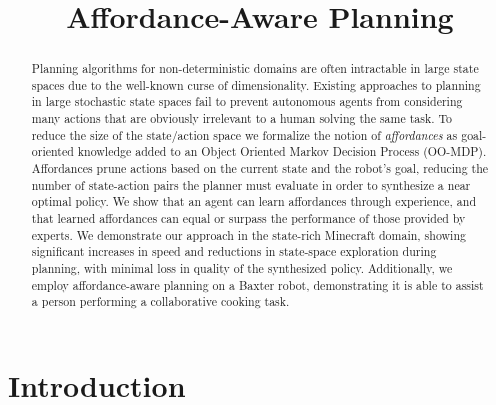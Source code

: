 \documentclass[conference]{IEEEtran}
\newcommand{\dnote}[1]{\textcolor{Green}{\textbf{}}}
\begin{document}
\title{Affordance-Aware Planning}


\maketitle

\begin{abstract}
Planning algorithms for non-deterministic domains are often
intractable in large state spaces due to the well-known curse of
dimensionality. Existing approaches to planning in large stochastic
state spaces fail to prevent autonomous agents from considering many
actions that are obviously irrelevant to a human solving the same
task. To reduce the size of the state/action space
we formalize the notion of {\em affordances} as
goal-oriented knowledge added to an Object Oriented Markov Decision
Process (OO-MDP).  Affordances prune actions based on the current
state and the robot's goal, reducing the number of state-action pairs
the planner must evaluate in order to synthesize a near optimal
policy. We show that an agent can learn affordances through
experience, and that learned affordances can equal or surpass the
performance of those provided by experts.
We demonstrate our approach in the state-rich Minecraft domain, showing significant increases in
speed and reductions in state-space exploration during planning, with
minimal loss in quality of the synthesized policy.  Additionally, we
employ affordance-aware planning on a Baxter robot, demonstrating it
is able to assist a person performing a collaborative cooking task.
\end{abstract}

\IEEEpeerreviewmaketitle

\section{Introduction}
\label{sec:introduction}
\end{document}
